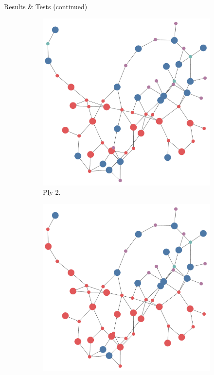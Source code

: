 \documentclass[final]{beamer} %
\begin{document}
\begin{frame}
\begin{columns}
\begin{column}{.3\textwidth}
{\begin{block}{Results \& Tests (continued)}
\begin{figure}[!htb]
\begin{subfigure}[!htb]{0.24\columnwidth}
							\includegraphics[width=\columnwidth]{figures/knn_forward_think_2.pdf}
							\caption{Ply 2.}
						\end{subfigure}
						\begin{subfigure}[!htb]{0.24\columnwidth}
							\centering
							\includegraphics[width=\columnwidth]{figures/knn_forward_think_3.pdf}

\end{subfigure}
\end{figure}
\end{block}}
\end{column}
\end{columns}
\end{frame}
\end{document}
